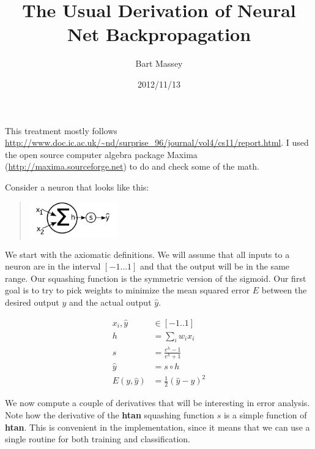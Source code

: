 \documentclass[12pt]{article}
\title{The Usual Derivation of Neural Net Backpropagation}
\author{Bart Massey}
\date{2012/11/13}
\newcommand{\yhat}{{\hat y}}
\newcommand{\Half}{{\frac 1 2}}
\begin{document}
\maketitle
This treatment mostly follows
\url{http://www.doc.ic.ac.uk/~nd/surprise_96/journal/vol4/cs11/report.html}.
I used the open source computer algebra package Maxima
(\url{http://maxima.sourceforge.net}) to do
and check some of the math.

Consider a neuron that looks like this:
\begin{quotation}
\includegraphics[height=0.6in]{neuron.pdf}
\end{quotation}

We start with the axiomatic definitions. We will assume that
all inputs to a neuron are in the interval $[-1\ldots 1]$
and that the output will be in the same range. Our squashing
function is the symmetric version of the sigmoid.  Our first
goal is to try to pick weights to minimize the mean squared
error $E$ between the desired output $y$ and the actual
output $\yhat$.

\begin{align}
x_i, \yhat &\in [-1..1] \\
h &= \sum_i{w_i x_i} \\
s &= \frac{e^h - 1}{e^h + 1} \\
\yhat &= s \circ h \\
E(y, \yhat) &= \Half (\yhat - y)^2
\end{align}

We now compute a couple of derivatives that will be
interesting in error analysis. Note how the derivative of
the {\bf htan} squashing function $s$ is a simple
function of {\bf htan}.  This is convenient in the
implementation, since it means that we can use a single
routine for both training and classification.
\end{document}
